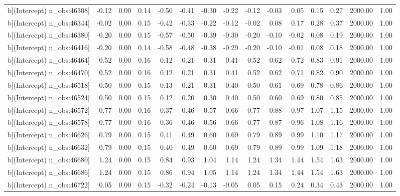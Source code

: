 \begin{table}[ht]
\begin{tabular}{rrrrrrrrrrrrrrr}
  b[(Intercept) n\_obs:46308] & -0.12 & 0.00 & 0.14 & -0.50 & -0.41 & -0.30 & -0.22 & -0.12 & -0.03 & 0.05 & 0.15 & 0.27 & 2000.00 & 1.00 \\ 
  b[(Intercept) n\_obs:46344] & -0.02 & 0.00 & 0.15 & -0.42 & -0.33 & -0.22 & -0.12 & -0.02 & 0.08 & 0.17 & 0.28 & 0.37 & 2000.00 & 1.00 \\ 
  b[(Intercept) n\_obs:46380] & -0.20 & 0.00 & 0.15 & -0.57 & -0.50 & -0.39 & -0.30 & -0.20 & -0.10 & -0.02 & 0.08 & 0.19 & 2000.00 & 1.00 \\ 
  b[(Intercept) n\_obs:46416] & -0.20 & 0.00 & 0.14 & -0.58 & -0.48 & -0.38 & -0.29 & -0.20 & -0.10 & -0.01 & 0.08 & 0.18 & 2000.00 & 1.00 \\ 
  b[(Intercept) n\_obs:46464] & 0.52 & 0.00 & 0.16 & 0.12 & 0.21 & 0.31 & 0.41 & 0.52 & 0.62 & 0.72 & 0.83 & 0.91 & 2000.00 & 1.00 \\ 
  b[(Intercept) n\_obs:46470] & 0.52 & 0.00 & 0.16 & 0.12 & 0.21 & 0.31 & 0.41 & 0.52 & 0.62 & 0.71 & 0.82 & 0.90 & 2000.00 & 1.00 \\ 
  b[(Intercept) n\_obs:46518] & 0.50 & 0.00 & 0.15 & 0.13 & 0.21 & 0.31 & 0.40 & 0.50 & 0.61 & 0.69 & 0.78 & 0.86 & 2000.00 & 1.00 \\ 
  b[(Intercept) n\_obs:46524] & 0.50 & 0.00 & 0.15 & 0.12 & 0.20 & 0.30 & 0.40 & 0.50 & 0.60 & 0.69 & 0.80 & 0.85 & 2000.00 & 1.00 \\ 
  b[(Intercept) n\_obs:46572] & 0.77 & 0.00 & 0.16 & 0.37 & 0.46 & 0.57 & 0.66 & 0.77 & 0.88 & 0.97 & 1.07 & 1.15 & 2000.00 & 1.00 \\ 
  b[(Intercept) n\_obs:46578] & 0.77 & 0.00 & 0.16 & 0.36 & 0.46 & 0.56 & 0.66 & 0.77 & 0.87 & 0.96 & 1.08 & 1.16 & 2000.00 & 1.00 \\ 
  b[(Intercept) n\_obs:46626] & 0.79 & 0.00 & 0.15 & 0.41 & 0.49 & 0.60 & 0.69 & 0.79 & 0.89 & 0.99 & 1.10 & 1.17 & 2000.00 & 1.00 \\ 
  b[(Intercept) n\_obs:46632] & 0.79 & 0.00 & 0.15 & 0.40 & 0.49 & 0.60 & 0.69 & 0.79 & 0.89 & 0.99 & 1.09 & 1.18 & 2000.00 & 1.00 \\ 
  b[(Intercept) n\_obs:46680] & 1.24 & 0.00 & 0.15 & 0.84 & 0.93 & 1.04 & 1.14 & 1.24 & 1.34 & 1.44 & 1.54 & 1.63 & 2000.00 & 1.00 \\ 
  b[(Intercept) n\_obs:46686] & 1.24 & 0.00 & 0.15 & 0.86 & 0.94 & 1.05 & 1.14 & 1.24 & 1.34 & 1.44 & 1.54 & 1.63 & 2000.00 & 1.00 \\ 
  b[(Intercept) n\_obs:46722] & 0.05 & 0.00 & 0.15 & -0.32 & -0.24 & -0.13 & -0.05 & 0.05 & 0.15 & 0.24 & 0.34 & 0.43 & 2000.00 & 1.00 \\ 

\end{tabular}
\end{table}
